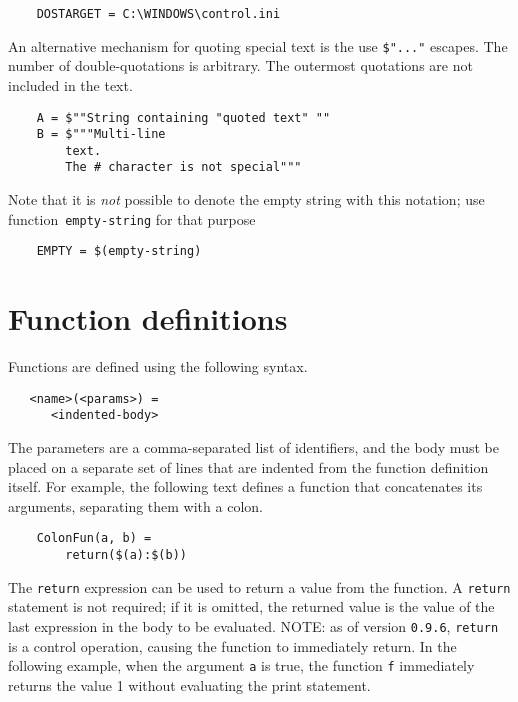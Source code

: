 \begin{verbatim}
    DOSTARGET = C:\WINDOWS\control.ini
\end{verbatim}

An alternative mechanism for quoting special text is the use \verb+$"..."+ escapes.  The number of
double-quotations is arbitrary.  The outermost quotations are not included in the text.

\begin{verbatim}
    A = $""String containing "quoted text" ""
    B = $"""Multi-line
        text.
        The # character is not special"""
\end{verbatim}

Note that it is \emph{not} possible to denote the empty string with
this notation; use function~\verb+empty-string+ for that purpose

\begin{verbatim}
    EMPTY = $(empty-string)
\end{verbatim}

\section{Function definitions}
\label{section:functions}

Functions are defined using the following syntax.

\begin{verbatim}
   <name>(<params>) =
      <indented-body>
\end{verbatim}

The parameters are a comma-separated list of identifiers, and the body must be placed on a separate
set of lines that are indented from the function definition itself.  For example, the following text
defines a function that concatenates its arguments, separating them with a colon.

\begin{verbatim}
    ColonFun(a, b) =
        return($(a):$(b))
\end{verbatim}

%
The \verb+return+ expression can be used to return a value from the function.  A \verb+return+
statement is not required; if it is omitted, the returned value is the value of the last expression
in the body to be evaluated.  NOTE: as of version \verb+0.9.6+, \verb+return+ is a control
operation, causing the function to immediately return.  In the following example, when the argument
\verb+a+ is true, the function \verb+f+ immediately returns the value 1 without evaluating the print
statement.

